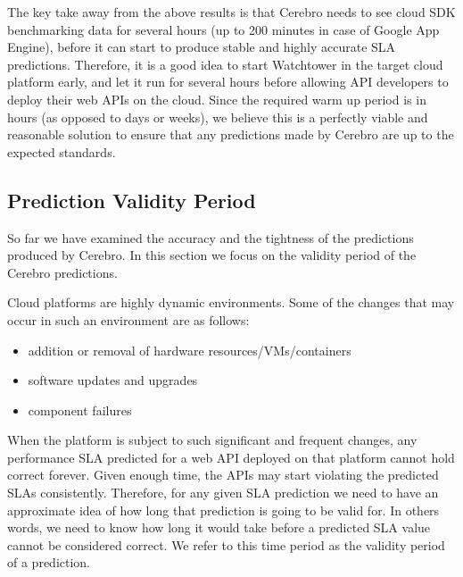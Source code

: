 The key take away from the above results is that Cerebro needs to see cloud SDK benchmarking data for several hours (up to 200 minutes in case of 
Google App Engine), before it can start to produce stable and highly accurate SLA predictions. Therefore, it is a good idea to start Watchtower in the
target cloud platform early, and let it run for several hours before allowing API developers to deploy their web APIs on the cloud. Since the
required warm up period is in hours (as opposed to days or weeks), we believe this is a perfectly viable and reasonable solution to
ensure that any predictions made by Cerebro are up to the expected standards.

\subsection{Prediction Validity Period}
So far we have examined the accuracy and the tightness of the predictions produced by Cerebro. In this section we focus on the validity
period of the Cerebro predictions.

Cloud platforms are highly dynamic environments. Some of the changes that may occur in such an environment are as follows:
\begin{itemize}
\item addition or removal of hardware resources/VMs/containers
\item software updates and upgrades
\item component failures
\end{itemize}

When the platform is subject to such significant and frequent changes, any performance SLA predicted for a web API deployed on that
platform cannot hold correct forever. Given enough time, the APIs may start violating the predicted SLAs consistently. Therefore, for any
given SLA prediction we need to have an approximate idea of how long that prediction is going to be valid for. In others words, we need
to know how long it would take before a predicted SLA value cannot be considered correct. We refer to this time period as the validity
period of a prediction.

